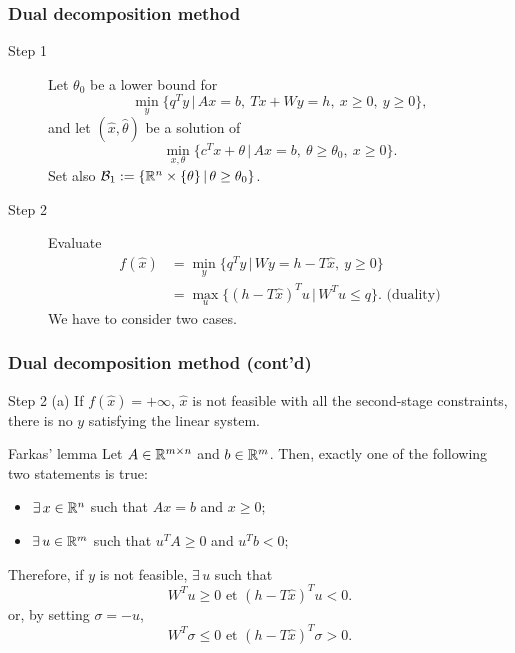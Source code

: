 \documentclass{beamer}
\begin{document}
\begin{frame}
\frametitle{Dual decomposition method}

\begin{description}
\item[\red Step 1]
Let $\theta_0$ be a lower bound for
\[
\min_y \lbrace q^Ty \,|\, Ax = b,\ Tx+Wy = h,\ x \geq 0,\ y \geq 0 \rbrace,
\]
and let $(\hat{x}, \hat{\theta})$ be a solution of
\[
\min_{x, \theta} \lbrace c^Tx + \theta \,|\, Ax = b,\ \theta \geq \theta_0,\ x
\geq 0 \rbrace.
\]
Set also $\mathcal{B}_1 := \lbrace {\mathbb{R}}^n \times \lbrace \theta \rbrace
\,|\, \theta \geq \theta_0 \rbrace$.
\item[\red Step 2]
Evaluate
\begin{align*}
f(\hat{x}) &= \min_y \lbrace q^Ty \,|\, Wy = h-T\hat{x},\ y \geq 0
\rbrace \\
&= \max_u \lbrace (h-T\hat{x})^Tu \,|\, W^Tu \leq q \rbrace. \mbox{ (duality)}
\end{align*}
We have to consider two cases.
\end{description}
\end{frame}

\begin{frame}
\frametitle{Dual decomposition method (cont'd)}

{\red Step 2 (a)}
If $f(\hat{x}) = +\infty$, $\hat{x}$ is not feasible with all the second-stage constraints, there is no $y$ satisfying the linear system.

\mbox{}

\begin{block}{Farkas' lemma}
Let $A \in {\mathbb{R}}^{m \times n}$ and $b \in {\mathbb{R}}^m$.
Then, exactly one of the following two statements is true:
\begin{itemize}
\item
$\exists\, x \in {\mathbb{R}}^n$ such that $Ax = b$ and $x \geq 0$;
\item
$\exists\, u \in {\mathbb{R}}^m$ such that $u^T A \geq 0$ and $u^T b < 0$;
\end{itemize}
\end{block}
	
\mbox{}

Therefore, if $y$ is not feasible, $\exists\, u$ such that
\[
W^Tu \geq 0 \mbox{ et } (h - T\hat{x})^T u < 0.
\]
or, by setting $\sigma = -u$,
\[
W^T\sigma \leq 0 \mbox{ et } (h - T\hat{x})^T \sigma > 0.
\]

\end{frame}
\end{document}
